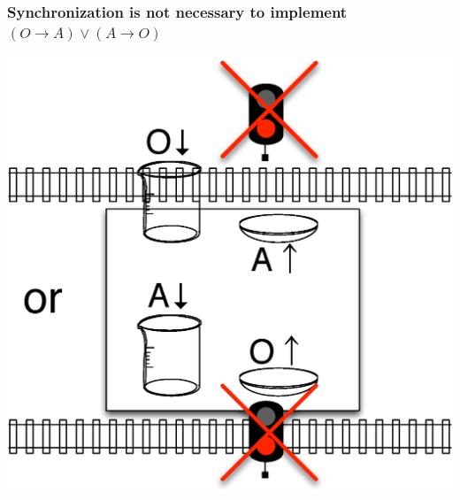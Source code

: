 \documentclass[slidestop,compress,mathserif]{beamer}
\newcommand{\ej}[2]{#1} %
\begin{document}
\begin{frame}
 \end{frame}

 \begin{frame}
  \ej
  {
  \frametitle{
  Synchronization is not necessary to implement $(O\rightarrow  A)\lor (A\rightarrow O)$
  }
  }
  {
  \frametitle{ダメット公理$(O\rightarrow  A)\lor (A\rightarrow O)$
  の実装に\\待ち合わせは不要}
  }

  \includegraphics[height=0.8\textheight]{d.eps}
 \end{frame}
\end{document}
